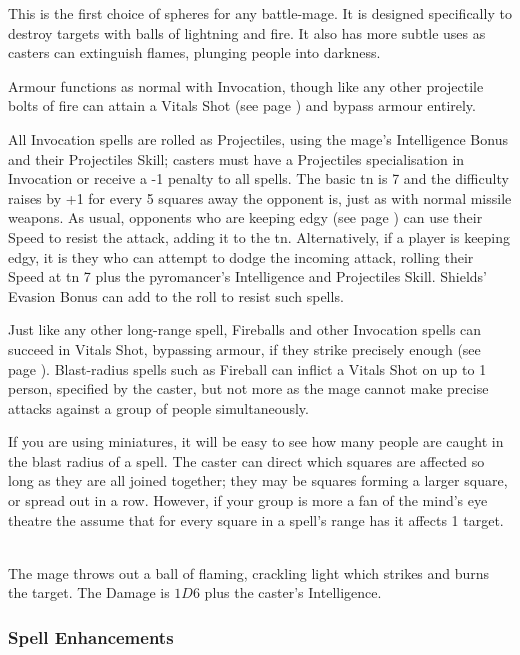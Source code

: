\begin{multicols}{2}

This is the first choice of spheres for any battle-mage.
It is designed specifically to destroy targets with balls of lightning and fire.
It also has more subtle uses as casters can extinguish flames, plunging people into darkness.

Armour functions as normal with Invocation, though like any other projectile bolts of fire can attain a Vitals Shot (see page \pageref{vitals}) and bypass armour entirely.

All Invocation spells are rolled as Projectiles, using the mage's Intelligence Bonus and their Projectiles Skill; casters must have a Projectiles specialisation in Invocation or receive a -1 penalty to all spells.
The basic \gls{tn} is 7 and the difficulty raises by +1 for every 5 squares away the opponent is, just as with normal missile weapons.
As usual, opponents who are keeping edgy (see page \pageref{edgy}) can use their Speed to resist the attack, adding it to the \gls{tn}.
Alternatively, if a player is keeping edgy, it is they who can attempt to dodge the incoming attack, rolling their Speed at \gls{tn} 7 plus the pyromancer's Intelligence and Projectiles Skill.
Shields' Evasion Bonus can add to the roll to resist such spells.

Just like any other long-range spell, Fireballs and other Invocation spells can succeed in Vitals Shot, bypassing armour, if they strike precisely enough (see page \pageref{vitals}). Blast-radius spells such as Fireball can inflict a Vitals Shot on up to 1 person, specified by the caster, but not more as the mage cannot make precise attacks against a group of people simultaneously.

If you are using miniatures, it will be easy to see how many people are caught in the blast radius of a spell. The caster can direct which squares are affected so long as they are all joined together; they may be squares forming a larger square, or spread out in a row. However, if your group is more a fan of the mind's eye theatre the assume that for every square in a spell's range has it affects 1 target.

\spelllevel

\\
The mage throws out a ball of flaming, crackling light which strikes and burns the target. The Damage is $1D6$ plus the caster's Intelligence.

\subsubsection{Spell Enhancements}


\end{multicols}
